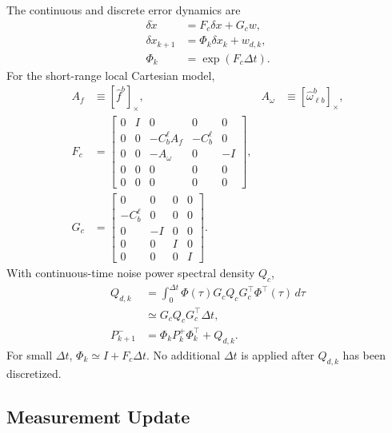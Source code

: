 \documentclass[]{IAC_style}
\begin{document}
The continuous and discrete error dynamics are
\begin{equation}
\tag{22}\label{eq:22}
\begin{aligned}\delta\dot x&=F_c\delta x+G_cw,\\\delta x_{k+1}&=\Phi_k\delta x_k+w_{d,k},\\\Phi_k&=\exp(F_c\Delta t).\end{aligned}
\end{equation}
For the short-range local Cartesian model,
\begin{equation}
\tag{23}\label{eq:23}
\begin{aligned}
A_f&\equiv[\hat f^b]_\times,
&A_\omega&\equiv[\hat\omega_{\ell b}^b]_\times,\\[2pt]
F_c&=
\begin{bmatrix}
0&I&0&0&0\\
0&0&-C_b^\ell A_f&-C_b^\ell&0\\
0&0&-A_\omega&0&-I\\
0&0&0&0&0\\
0&0&0&0&0
\end{bmatrix},\\[4pt]
G_c&=
\begin{bmatrix}
0&0&0&0\\
-C_b^\ell&0&0&0\\
0&-I&0&0\\
0&0&I&0\\
0&0&0&I
\end{bmatrix}.
\end{aligned}
\end{equation}
With continuous-time noise power spectral density $Q_c$,
\begin{equation}
\tag{24}\label{eq:24}
\begin{aligned}Q_{d,k}&=\int_0^{\Delta t}\Phi(\tau)G_cQ_cG_c^\top\Phi^\top(\tau)\,d\tau\\&\simeq G_cQ_cG_c^\top\Delta t,\\P_{k+1}^-&=\Phi_kP_k^+\Phi_k^\top+Q_{d,k}.\end{aligned}
\end{equation}
For small $\Delta t$, $\Phi_k\simeq I+F_c\Delta t$. No additional $\Delta t$ is applied after $Q_{d,k}$ has been discretized.

\subsection{Measurement Update}
\end{document}

